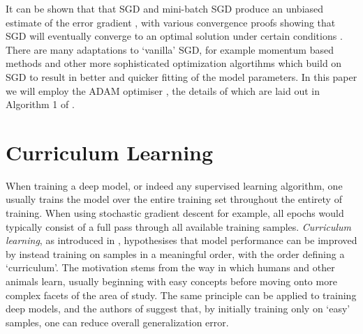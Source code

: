 It can be shown that that SGD and mini-batch SGD produce an unbiased estimate of the error gradient \cite{shamir2013stochastic}, with various convergence proofs showing that SGD will eventually converge to an optimal solution under certain conditions \cite{shamir2013stochastic}. There are many adaptations to `vanilla' SGD, for example momentum based methods \cite{sutskever2013importance} and other more sophisticated optimization algortihms which build on SGD to result in better and quicker fitting of the model parameters. In this paper we will employ the ADAM optimiser \cite{kingma2014adam}, the details of which are laid out in Algorithm 1 of \cite{kingma2014adam}. 




\section{Curriculum Learning}
When training a deep model, or indeed any supervised learning algorithm, one usually trains the model over the entire training set throughout the entirety of training. When using stochastic gradient descent for example, all epochs would typically consist of a full pass through all available training samples. \textit{Curriculum learning}, as introduced in \cite{Bengio2009}, hypothesises that model performance can be improved by instead training on samples in a meaningful order, with the order defining a `curriculum'. The motivation stems from the way in which humans and other animals  learn, usually beginning with easy concepts before moving onto more complex facets of the area of study. The same principle can be applied to training deep models, and the authors of \cite{Bengio2009} suggest that, by initially training only on `easy' samples, one can reduce overall generalization error. 

